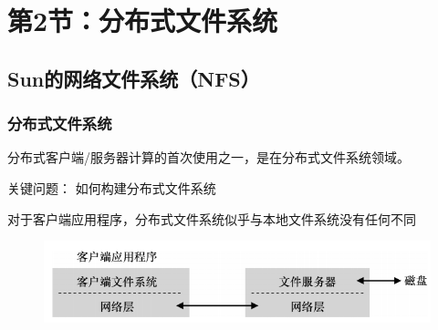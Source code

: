     \section{第2节：分布式文件系统} %
    \subsection{Sun的网络文件系统（NFS）} %
    \begin{frame}[fragile]
        \frametitle{分布式文件系统}
        分布式客户端/服务器计算的首次使用之一，是在分布式文件系统领域。
        
        关键问题：  如何构建分布式文件系统　
        
        对于客户端应用程序，分布式文件系统似乎与本地文件系统没有任何不同
        
            \begin{figure}
            \includegraphics[width=0.8\linewidth]{figs/distributed-fs.png}
            \end{figure}
    \end{frame}
